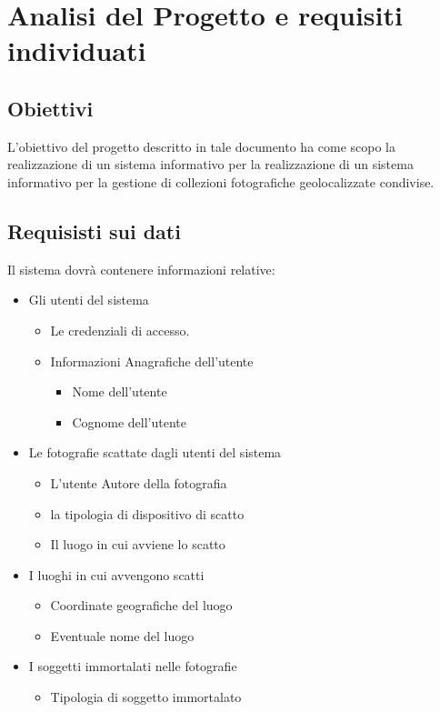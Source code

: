 \chapter{Analisi del Progetto e requisiti individuati}
\section{Obiettivi}
L’obiettivo del progetto descritto in tale documento ha come scopo la realizzazione di un sistema informativo per la realizzazione di un sistema informativo per la gestione di collezioni fotografiche geolocalizzate condivise.
\section{Requisisti sui dati}
Il sistema dovrà contenere informazioni relative:
\begin{itemize}
    \item Gli utenti del sistema
        \begin{itemize}
            \item Le credenziali di accesso.
             \item Informazioni Anagrafiche dell’utente
                \begin{itemize}
                    \item Nome dell’utente
                    \item Cognome dell’utente
                \end{itemize}
        \end{itemize}
    \item Le fotografie scattate dagli utenti del sistema
        \begin{itemize}
            \item L’utente Autore della fotografia
            \item la tipologia di dispositivo di scatto
            \item Il luogo in cui avviene lo scatto
        \end{itemize}
    \item I luoghi in cui avvengono scatti
        \begin{itemize}
            \item Coordinate geografiche del luogo
            \item Eventuale nome del luogo
        \end{itemize}
    \item I soggetti immortalati nelle fotografie
        \begin{itemize}
            \item Tipologia di soggetto immortalato
        \end{itemize}
\end{itemize}

